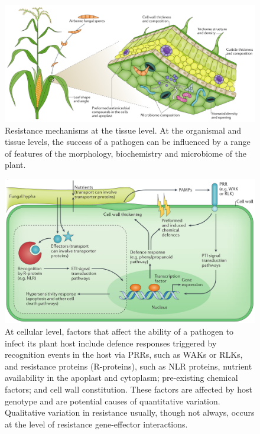 \documentclass[11pt,dvipsnames,ignorenonframetext,aspectratio=169]{beamer}
\begin{document}
\begin{frame}{}
\protect\hypertarget{section-1}{}
\begin{figure}
\includegraphics[width=0.8\linewidth]{../images/infection_process_plants_extracellular} \caption{Resistance mechanisms at the tissue level. At the organismal and tissue levels, the success of a pathogen can be influenced by a range of features of the morphology, biochemistry and microbiome of the plant.}\label{fig:infection-mechanism-extracellular}
\end{figure}
\end{frame}

\begin{frame}{}
\protect\hypertarget{section-2}{}
\begin{figure}
\includegraphics[width=0.78\linewidth]{../images/infection_process_plants_intracellular} \caption{At cellular level, factors that affect the ability of a pathogen to infect its plant host include defence responses triggered by recognition events in the host via PRRs, such as WAKs or RLKs, and resistance proteins (R-proteins), such as NLR proteins, nutrient availability in the apoplast and cytoplasm; pre-existing chemical factors; and cell wall constitution. These factors are affected by host genotype and are potential causes of quantitative variation. Qualitative variation in resistance usually, though not always, occurs at the level of resistance gene-effector interactions.}\label{fig:infection-mechanism-intracellular}
\end{figure}
\end{frame}
\end{document}
